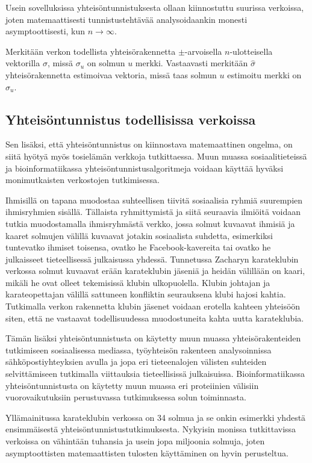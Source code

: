 \documentclass[finnish,12pt,a4paper,pdftex,sci,utf8]{aaltothesis}
\begin{document}
Usein sovelluksissa yhteisöntunnistuksesta ollaan kiinnostuttu suurissa verkoissa, joten matemaattisesti tunnistustehtävää analysoidaankin monesti asymptoottisesti, kun $n \rightarrow \infty$.

Merkitään verkon todellista yhteisörakennetta ${\pm}$-arvoisella $n$-ulotteisella vektorilla $\sigma$, missä $\sigma_u$ on solmun $u$ merkki. Vastaavasti merkitään $\hat{\sigma}$ yhteisörakennetta estimoivaa vektoria, missä taas solmun $u$ estimoitu merkki on $\hat{\sigma}_u$.

\subsection{Yhteisöntunnistus todellisissa verkoissa}

Sen lisäksi, että yhteisöntunnistus on kiinnostava matemaattinen ongelma, on siitä hyötyä myös tosielämän verkkoja tutkittaessa. Muun muassa sosiaalitieteissä ja bioinformatiikassa yhteisöntunnistusalgoritmeja voidaan käyttää hyväksi monimutkaisten verkostojen tutkimisessa.

Ihmisillä on tapana muodostaa suhteellisen tiivitä sosiaalisia ryhmiä suurempien ihmisryhmien sisällä. Tällaista ryhmittymistä ja siitä seuraavia ilmiöitä voidaan tutkia muodostamalla ihmisryhmästä verkko, jossa solmut kuvaavat ihmisiä ja kaaret solmujen välillä kuvaavat jotakin sosiaalista suhdetta, esimerkiksi tuntevatko ihmiset toisensa, ovatko he Facebook-kavereita tai ovatko he julkaisseet tieteellisessä julkaisussa yhdessä. Tunnetussa Zacharyn karateklubin verkossa solmut kuvaavat erään karateklubin jäseniä ja heidän välillään on kaari, mikäli he ovat olleet tekemisissä klubin ulkopuolella. Klubin johtajan ja karateopettajan välillä sattuneen konfliktin seurauksena klubi hajosi kahtia. Tutkimalla verkon rakennetta klubin jäsenet voidaan erotella kahteen yhteisöön siten, että ne vastaavat todellisuudessa muodostuneita kahta uutta karateklubia.

Tämän lisäksi yhteisöntunnistusta on käytetty muun muassa yhteisörakenteiden tutkimiseen sosiaalisessa mediassa, työyhteisön rakenteen analysoinnissa sähköpostiyhteyksien avulla ja jopa eri tieteenalojen välisten suhteiden selvittämiseen tutkimalla viittauksia tieteellisissä julkaisuissa. Bioinformatiikassa yhteisöntunnistusta on käytetty muun muassa eri proteiinien välisiin vuorovaikutuksiin perustuvassa tutkimuksessa solun toiminnasta.

Yllämainitussa karateklubin verkossa on 34 solmua ja se onkin esimerkki yhdestä ensimmäisestä yhteisöntunnistustutkimuksesta. Nykyisin monissa tutkittavissa verkoissa on vähintään tuhansia ja usein jopa miljoonia solmuja, joten asymptoottisten matemaattisten tulosten käyttäminen on hyvin perusteltua.
\end{document}
